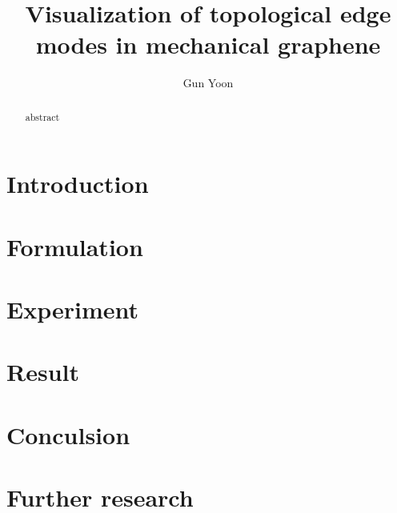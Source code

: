 \documentclass[a4paper]{article}
\title{Visualization of topological edge modes in mechanical graphene}
\author{Gun Yoon}
\begin{document}
\maketitle

\begin{abstract}
    abstract 
\end{abstract}

\newpage

\begin{multicols*}{2}

    \section{Introduction}

    

    \section{Formulation}

    

    \section{Experiment}

    

    \section{Result}

    \section{Conculsion}

    \section{Further research}

    
    

\end{multicols*}
\end{document}
